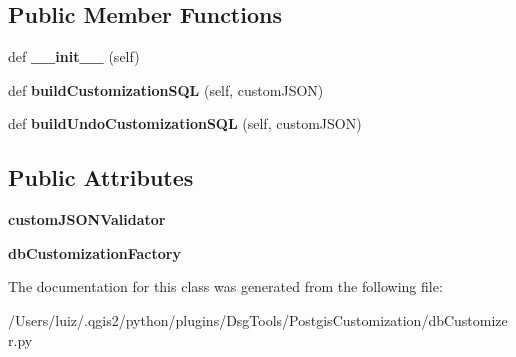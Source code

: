 \subsection*{Public Member Functions}
\begin{DoxyCompactItemize}
\item 
\mbox{\label{class_dsg_tools_1_1_postgis_customization_1_1db_customizer_1_1_db_customizer_a6eca6b24aaedbabdd86c72e6ffb5bcbd}} 
def {\bfseries \+\_\+\+\_\+init\+\_\+\+\_\+} (self)
\item 
\mbox{\label{class_dsg_tools_1_1_postgis_customization_1_1db_customizer_1_1_db_customizer_a0f199e69b457ef031fedf6ae0cf3c10f}} 
def {\bfseries build\+Customization\+S\+QL} (self, custom\+J\+S\+ON)
\item 
\mbox{\label{class_dsg_tools_1_1_postgis_customization_1_1db_customizer_1_1_db_customizer_a59dcbc2a4c33c140ae057a93e0b6f1fe}} 
def {\bfseries build\+Undo\+Customization\+S\+QL} (self, custom\+J\+S\+ON)
\end{DoxyCompactItemize}
\subsection*{Public Attributes}
\begin{DoxyCompactItemize}
\item 
\mbox{\label{class_dsg_tools_1_1_postgis_customization_1_1db_customizer_1_1_db_customizer_a527f90380abc94213c51f2a42d557fba}} 
{\bfseries custom\+J\+S\+O\+N\+Validator}
\item 
\mbox{\label{class_dsg_tools_1_1_postgis_customization_1_1db_customizer_1_1_db_customizer_a8c2f742e5c7d0d345720aa9354fc0639}} 
{\bfseries db\+Customization\+Factory}
\end{DoxyCompactItemize}


The documentation for this class was generated from the following file\+:\begin{DoxyCompactItemize}
\item 
/\+Users/luiz/.\+qgis2/python/plugins/\+Dsg\+Tools/\+Postgis\+Customization/db\+Customizer.\+py\end{DoxyCompactItemize}
